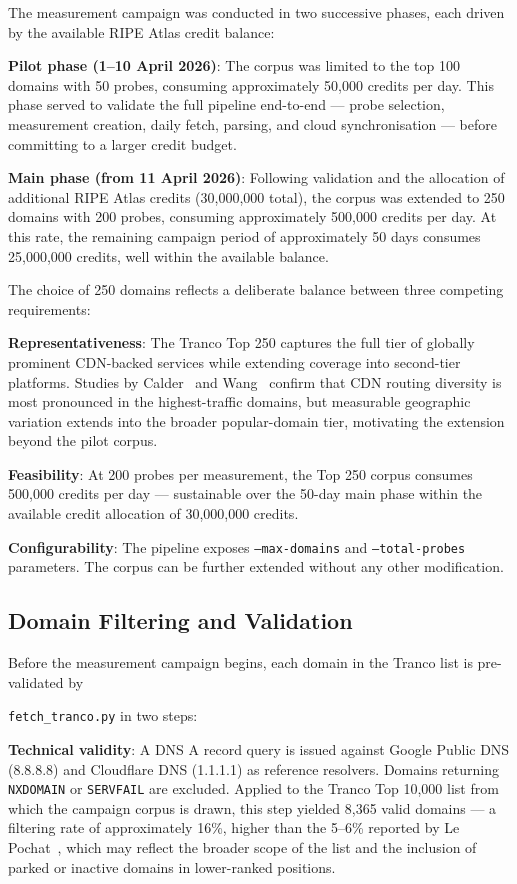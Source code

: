 The measurement campaign was conducted in two successive phases, each driven by the available RIPE Atlas credit balance:

\textbf{Pilot phase (1--10 April 2026)}: The corpus was limited to the top 100 domains with 50 probes, consuming approximately 50,000 credits per day. This phase served to validate the full pipeline end-to-end --- probe selection, measurement creation, daily fetch, parsing, and cloud synchronisation --- before committing to a larger credit budget.

\textbf{Main phase (from 11 April 2026)}: Following validation and the allocation of additional RIPE Atlas credits (30,000,000 total), the corpus was extended to 250 domains with 200 probes, consuming approximately 500,000 credits per day. At this rate, the remaining campaign period of approximately 50 days consumes 25,000,000 credits, well within the available balance.

The choice of 250 domains reflects a deliberate balance between three competing requirements:

\textbf{Representativeness}: The Tranco Top 250 captures the full tier of globally prominent \ac{CDN}-backed services while extending coverage into second-tier platforms. Studies by Calder~\cite{Calder2015} and Wang~\cite{Wang2018} confirm that \ac{CDN} routing diversity is most pronounced in the highest-traffic domains, but measurable geographic variation extends into the broader popular-domain tier, motivating the extension beyond the pilot corpus.

\textbf{Feasibility}: At 200 probes per measurement, the Top 250 corpus consumes 500,000 credits per day --- sustainable over the 50-day main phase within the available credit allocation of 30,000,000 credits.

\textbf{Configurability}: The pipeline exposes \texttt{--max-domains} and \texttt{--total-probes} parameters. The corpus can be further extended without any other modification.

\subsection{Domain Filtering and Validation}
\label{subsec:3.2.3}

Before the measurement campaign begins, each domain in the Tranco list is pre-validated by 

\texttt{fetch\_tranco.py} in two steps:

\textbf{Technical validity}: A \ac{DNS} \ac{A} record query is issued against Google Public \ac{DNS} (8.8.8.8) and Cloudflare \ac{DNS} (1.1.1.1) as reference resolvers. Domains returning \texttt{NXDOMAIN} or \texttt{SERVFAIL} are excluded. Applied to the Tranco Top 10,000 list from which the campaign corpus is drawn, this step yielded 8,365 valid domains --- a filtering rate of approximately 16\%, higher than the 5--6\% reported by Le Pochat~\cite{LePochat2019}, which may reflect the broader scope of the list and the inclusion of parked or inactive domains in lower-ranked positions.

